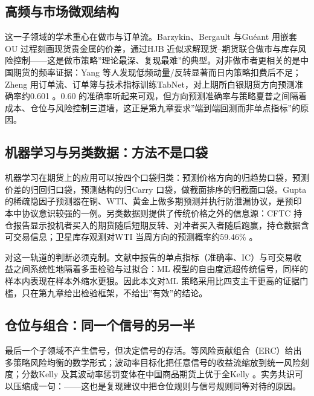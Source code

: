 \documentclass[12pt,a4paper]{ctexart}
\begin{document}
\subsection{高频与市场微观结构}

这一子领域的学术重心在做市与订单流。Barzykin、Bergault 与Guéant 用嵌套OU 过程刻画现货贵金属的价差，通过HJB 近似求解现货–期货联合做市与库存风险控制\cite{79}——这是做市策略”\hspace{0.3em}理论最深、复现最难”\hspace{0.3em}的典型。对非做市者更相关的是中国期货的频率证据：Yang 等人发现低频动量/反转显著而日内策略扣费后不足\cite{77}；Zheng 用订单流、订单簿与技术指标训练TabNet，对上期所白银期货方向预测准确率约0.601 \cite{78}。0.60 的准确率听起来可观，但方向预测准确率与策略夏普之间隔着成本、仓位与风险控制三道墙，这正是第九章要求”\hspace{0.3em}端到端回测而非单点指标”\hspace{0.3em}的原因。


\subsection{机器学习与另类数据：方法不是口袋}

机器学习在期货上的应用可以按四个口袋归类：预测价格方向的归趋势口袋\cite{81}，预测价差的归回归口袋\cite{34}，预测结构的归Carry 口袋，做截面排序的归截面口袋。Gupta 的稀疏隐因子预测器在铜、WTI、黄金上做多期预测并执行防泄漏协议\cite{82}，是预印本中协议意识较强的一例。另类数据则提供了传统价格之外的信息源：CFTC 持仓报告显示投机者买入的期货随后短期反转、对冲者买入者随后跑赢，持仓数据含可交易信息\cite{80}；卫星库存观测对WTI 当周方向的预测概率约59.46\% \cite{83}。


对这一轨道的判断必须克制。文献中报告的单点指标（准确率、IC）与可交易收益之间系统性地隔着多重检验与过拟合：ML 模型的自由度远超传统信号，同样的样本内表现在样本外缩水更狠\cite{36}。因此本文对ML 策略采用比四支主干更高的证据门槛，只在第九章给出检验框架，不给出”\hspace{0.3em}有效”\hspace{0.3em}的结论。


\subsection{仓位与组合：同一个信号的另一半}

最后一个子领域不产生信号，但决定信号的存活。等风险贡献组合（ERC）给出多策略风险均衡的数学形式\cite{84}；波动率目标化把任意信号的收益流缩放到统一风险刻度\cite{08}；分数Kelly 及其波动率惩罚变体在中国商品期货上优于全Kelly \cite{85}。实务共识可以压缩成一句：——这也是复现建议中把仓位规则与信号规则同等对待的原因。
\end{document}
